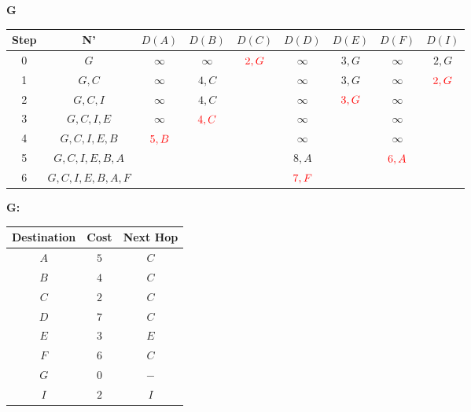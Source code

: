 \documentclass[10pt]{article}
\begin{document}
			\begin{center}
				\textbf{G}
				\begin{tabular}{||c c c c c c c c c||} 
					\hline
					Step & N' & $D(A)$ & $D(B)$ & $D(C)$ & $D(D)$ & $D(E)$ & $D(F)$ & $D(I)$ \\
					\hline\hline
					0 & $G$ & $\infty$ & $\infty$ & $\color{red} 2,G$ & $\infty$ & $3,G$ & $\infty$ & $2,G$ \\
					\hline
					1 & $G,C$ & $\infty$ & $4,C$ & & $\infty$ & $3,G$ & $\infty$ & $\color{red} 2,G$ \\
					\hline
					2 & $G,C,I$ & $\infty$ & $4,C$ & & $\infty$ & $\color{red} 3,G$ & $\infty$ & \\
					\hline
					3 & $G,C,I,E$ & $\infty$ & $\color{red} 4,C$ & & $\infty$ & & $\infty$ & \\ 
					\hline
					4 & $G,C,I,E,B$ & $\color{red} 5,B$ & & & $\infty$ & & $\infty$ & \\
					\hline
					5 & $G,C,I,E,B,A$ & & & & $8,A$ & & $\color{red} 6,A$ & \\
					\hline
					6 & $G,C,I,E,B,A,F$ & & & & $\color{red} 7,F$ & & & \\[0.5ex]
					\hline
				\end{tabular}
			\end{center}
			\begin{center}
				\textbf{G:}
				\begin{tabular}{||c || c || c||}
					\hline
					Destination & Cost & Next Hop\\ [0.5ex] 
					\hline\hline
					$A$ & $5$ & $C$ \\
					$B$ & $4$ & $C$ \\
					$C$ & $2$ & $C$ \\
					$D$ & $7$ & $C$ \\
					$E$ & $3$ & $E$ \\
					$F$ & $6$ & $C$ \\
					$G$ & $0$ & $-$ \\
					$I$ & $2$ & $I$ \\[0.5ex] 
					\hline
				\end{tabular}
			\end{center}		
		
\end{document}
